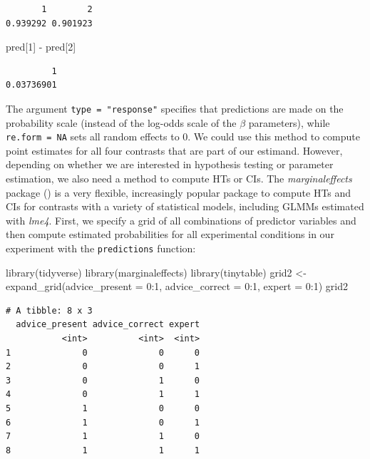 \documentclass[
  man,
  floatsintext,
  longtable,
  a4paper,
  nolmodern,
  notxfonts,
  notimes,
  colorlinks=true,linkcolor=blue,citecolor=blue,urlcolor=blue]{apa7}
\newenvironment{Shaded}{\begin{snugshade}}{\end{snugshade}}
\newcommand{\AttributeTok}[1]{\textcolor[rgb]{0.40,0.45,0.13}{#1}}
\newcommand{\DecValTok}[1]{\textcolor[rgb]{0.68,0.00,0.00}{#1}}
\newcommand{\FunctionTok}[1]{\textcolor[rgb]{0.28,0.35,0.67}{#1}}
\newcommand{\NormalTok}[1]{\textcolor[rgb]{0.00,0.23,0.31}{#1}}
\newcommand{\OtherTok}[1]{\textcolor[rgb]{0.00,0.23,0.31}{#1}}
\newcommand{\SpecialCharTok}[1]{\textcolor[rgb]{0.37,0.37,0.37}{#1}}
\begin{document}
\begin{verbatim}
       1        2 
0.939292 0.901923 
\end{verbatim}

\begin{Shaded}
\begin{Highlighting}[]
\NormalTok{pred[}\DecValTok{1}\NormalTok{] }\SpecialCharTok{{-}}\NormalTok{ pred[}\DecValTok{2}\NormalTok{]}
\end{Highlighting}
\end{Shaded}

\begin{verbatim}
         1 
0.03736901 
\end{verbatim}

The argument \texttt{type\ =\ "response"} specifies that predictions are
made on the probability scale (instead of the log-odds scale of the
\(\beta\) parameters), while \texttt{re.form\ =\ NA} sets all random
effects to 0. We could use this method to compute point estimates for
all four contrasts that are part of our estimand. However, depending on
whether we are interested in hypothesis testing or parameter estimation,
we also need a method to compute HTs or CIs. The \emph{marginaleffects}
package () is a very flexible, increasingly popular package to
compute HTs and CIs for contrasts with a variety of statistical models,
including GLMMs estimated with \emph{lme4}. First, we specify a grid of
all combinations of predictor variables and then compute estimated
probabilities for all experimental conditions in our experiment with the
\texttt{predictions} function:

\begin{Shaded}
\begin{Highlighting}[]
\FunctionTok{library}\NormalTok{(tidyverse)}
\FunctionTok{library}\NormalTok{(marginaleffects)}
\FunctionTok{library}\NormalTok{(tinytable)}
\NormalTok{grid2 }\OtherTok{\textless{}{-}} \FunctionTok{expand\_grid}\NormalTok{(}\AttributeTok{advice\_present =} \DecValTok{0}\SpecialCharTok{:}\DecValTok{1}\NormalTok{, }
  \AttributeTok{advice\_correct =} \DecValTok{0}\SpecialCharTok{:}\DecValTok{1}\NormalTok{, }\AttributeTok{expert =} \DecValTok{0}\SpecialCharTok{:}\DecValTok{1}\NormalTok{)}
\NormalTok{grid2}
\end{Highlighting}
\end{Shaded}

\begin{verbatim}
# A tibble: 8 x 3
  advice_present advice_correct expert
           <int>          <int>  <int>
1              0              0      0
2              0              0      1
3              0              1      0
4              0              1      1
5              1              0      0
6              1              0      1
7              1              1      0
8              1              1      1
\end{verbatim}
\end{document}
